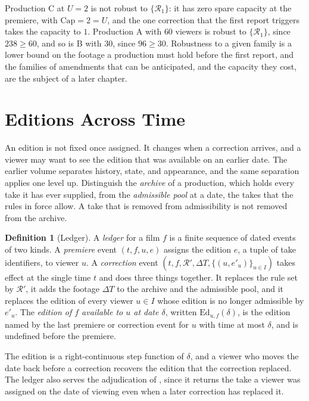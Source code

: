 \documentclass[11pt,twoside,openright]{book}
\theoremstyle{plain}
\theoremstyle{definition}
\newtheorem{definition}[theorem]{Definition}
\theoremstyle{remark}
\begin{document}
Production C at $U=2$ is not robust to $\{\mathcal R_1\}$: it has zero spare capacity at the premiere, with $\mathrm{Cap}=2=U$, and the one correction that the first report triggers takes the capacity to $1$. Production A with $60$ viewers is robust to $\{\mathcal R_1\}$, since $238\ge60$, and so is B with $30$, since $96\ge30$. Robustness to a given family is a lower bound on the footage a production must hold before the first report, and the families of amendments that can be anticipated, and the capacity they cost, are the subject of a later chapter.

\section{Editions Across Time}\label{sec:ledger}

An edition is not fixed once assigned. It changes when a correction arrives, and a viewer may want to see the edition that was available on an earlier date. The earlier volume separates history, state, and appearance, and the same separation applies one level up. Distinguish the \emph{archive} of a production, which holds every take it has ever supplied, from the \emph{admissible pool} at a date, the takes that the rules in force allow. A take that is removed from admissibility is not removed from the archive.

\begin{definition}[Ledger]\label{def:ledger}
A \emph{ledger} for a film $f$ is a finite sequence of dated events of two kinds. A \emph{premiere} event $(t,f,u,e)$ assigns the edition $e$, a tuple of take identifiers, to viewer $u$. A \emph{correction} event $(t,f,\mathcal R',\Delta T,\{(u,e'_u)\}_{u\in I})$ takes effect at the single time $t$ and does three things together. It replaces the rule set by $\mathcal R'$, it adds the footage $\Delta T$ to the archive and the admissible pool, and it replaces the edition of every viewer $u\in I$ whose edition is no longer admissible by $e'_u$. The \emph{edition of $f$ available to $u$ at date $\delta$}, written $\mathrm{Ed}_{u,f}(\delta)$, is the edition named by the last premiere or correction event for $u$ with time at most $\delta$, and is undefined before the premiere.
\end{definition}

The edition is a right-continuous step function of $\delta$, and a viewer who moves the date back before a correction recovers the edition that the correction replaced. The ledger also serves the adjudication of , since it returns the take a viewer was assigned on the date of viewing even when a later correction has replaced it.
\end{document}
